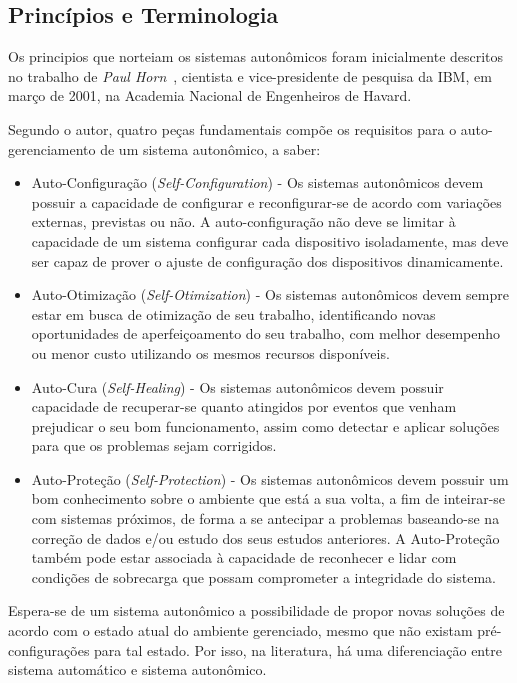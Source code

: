 \documentclass[11pt,twoside]{article}
\begin{document}
\subsection{Princípios e Terminologia}
Os principios que norteiam os sistemas autonômicos foram inicialmente descritos no trabalho de \textit{Paul Horn}~\cite{KEPHART}, cientista e vice-presidente de pesquisa da IBM, em março de 2001, na Academia Nacional de Engenheiros de Havard. 

Segundo o autor, quatro peças fundamentais compõe os requisitos para o auto-gerenciamento de um sistema autonômico, a saber:

\begin{itemize}

\item Auto-Configuração (\textit{Self-Configuration}) - Os sistemas autonômicos devem possuir a capacidade de configurar e reconfigurar-se de acordo com variações externas, previstas ou não. A auto-configuração não deve se limitar à capacidade de um sistema configurar cada dispositivo isoladamente, mas deve ser capaz de prover o ajuste de configuração dos dispositivos dinamicamente.

\item Auto-Otimização (\textit{Self-Otimization}) - Os sistemas autonômicos devem sempre estar em busca de otimização de seu trabalho, identificando novas oportunidades de aperfeiçoamento do seu trabalho, com melhor desempenho ou menor custo utilizando os mesmos recursos disponíveis.

\item Auto-Cura (\textit{Self-Healing}) - Os sistemas autonômicos devem possuir capacidade de recuperar-se quanto atingidos por eventos que venham prejudicar o seu bom funcionamento, assim como detectar e aplicar soluções para que os problemas sejam corrigidos. 

\item Auto-Proteção (\textit{Self-Protection}) - Os sistemas autonômicos devem possuir um bom conhecimento sobre o ambiente que está a sua volta, a fim de inteirar-se com sistemas próximos, de forma a se antecipar a problemas baseando-se na correção de dados e/ou estudo dos seus estudos anteriores. A Auto-Proteção também pode estar associada à capacidade de reconhecer e lidar com condições de sobrecarga que possam comprometer a integridade do sistema.

\end{itemize}
Espera-se de um sistema autonômico a possibilidade de propor novas soluções de acordo com o estado atual do ambiente gerenciado, mesmo que não existam pré-configurações para tal estado. Por isso, na literatura, há uma diferenciação entre sistema automático e sistema autonômico. 
\end{document}
